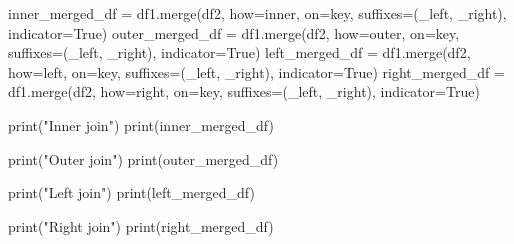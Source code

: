 \documentclass[
  english,
  letterpaper,
  DIV=11,
  numbers=noendperiod]{scrreprt}
\newenvironment{Shaded}{\begin{snugshade}}{\end{snugshade}}
\newcommand{\BuiltInTok}[1]{\textcolor[rgb]{0.00,0.23,0.31}{#1}}
\newcommand{\NormalTok}[1]{\textcolor[rgb]{0.00,0.23,0.31}{#1}}
\newcommand{\OperatorTok}[1]{\textcolor[rgb]{0.37,0.37,0.37}{#1}}
\newcommand{\StringTok}[1]{\textcolor[rgb]{0.13,0.47,0.30}{#1}}
\newcommand{\VariableTok}[1]{\textcolor[rgb]{0.07,0.07,0.07}{#1}}
\begin{document}
\begin{Shaded}
\begin{Highlighting}[]
\NormalTok{inner\_merged\_df }\OperatorTok{=}\NormalTok{ df1.merge(df2, how}\OperatorTok{=}\StringTok{\textquotesingle{}inner\textquotesingle{}}\NormalTok{, on}\OperatorTok{=}\StringTok{\textquotesingle{}key\textquotesingle{}}\NormalTok{, suffixes}\OperatorTok{=}\NormalTok{(}\StringTok{\textquotesingle{}\_left\textquotesingle{}}\NormalTok{, }\StringTok{\textquotesingle{}\_right\textquotesingle{}}\NormalTok{),}
\NormalTok{                            indicator}\OperatorTok{=}\VariableTok{True}\NormalTok{)}
\NormalTok{outer\_merged\_df }\OperatorTok{=}\NormalTok{ df1.merge(df2, how}\OperatorTok{=}\StringTok{\textquotesingle{}outer\textquotesingle{}}\NormalTok{, on}\OperatorTok{=}\StringTok{\textquotesingle{}key\textquotesingle{}}\NormalTok{, suffixes}\OperatorTok{=}\NormalTok{(}\StringTok{\textquotesingle{}\_left\textquotesingle{}}\NormalTok{, }\StringTok{\textquotesingle{}\_right\textquotesingle{}}\NormalTok{),}
\NormalTok{                            indicator}\OperatorTok{=}\VariableTok{True}\NormalTok{)}
\NormalTok{left\_merged\_df }\OperatorTok{=}\NormalTok{ df1.merge(df2, how}\OperatorTok{=}\StringTok{\textquotesingle{}left\textquotesingle{}}\NormalTok{, on}\OperatorTok{=}\StringTok{\textquotesingle{}key\textquotesingle{}}\NormalTok{, suffixes}\OperatorTok{=}\NormalTok{(}\StringTok{\textquotesingle{}\_left\textquotesingle{}}\NormalTok{, }\StringTok{\textquotesingle{}\_right\textquotesingle{}}\NormalTok{),}
\NormalTok{                           indicator}\OperatorTok{=}\VariableTok{True}\NormalTok{)}
\NormalTok{right\_merged\_df }\OperatorTok{=}\NormalTok{ df1.merge(df2, how}\OperatorTok{=}\StringTok{\textquotesingle{}right\textquotesingle{}}\NormalTok{, on}\OperatorTok{=}\StringTok{\textquotesingle{}key\textquotesingle{}}\NormalTok{, suffixes}\OperatorTok{=}\NormalTok{(}\StringTok{\textquotesingle{}\_left\textquotesingle{}}\NormalTok{, }\StringTok{\textquotesingle{}\_right\textquotesingle{}}\NormalTok{),}
\NormalTok{                            indicator}\OperatorTok{=}\VariableTok{True}\NormalTok{)}

\BuiltInTok{print}\NormalTok{(}\StringTok{"Inner join"}\NormalTok{)}
\BuiltInTok{print}\NormalTok{(inner\_merged\_df)}

\BuiltInTok{print}\NormalTok{(}\StringTok{"Outer join"}\NormalTok{)}
\BuiltInTok{print}\NormalTok{(outer\_merged\_df)}

\BuiltInTok{print}\NormalTok{(}\StringTok{"Left join"}\NormalTok{)}
\BuiltInTok{print}\NormalTok{(left\_merged\_df)}

\BuiltInTok{print}\NormalTok{(}\StringTok{"Right join"}\NormalTok{)}
\BuiltInTok{print}\NormalTok{(right\_merged\_df)}
\end{Highlighting}
\end{Shaded}
\end{document}
